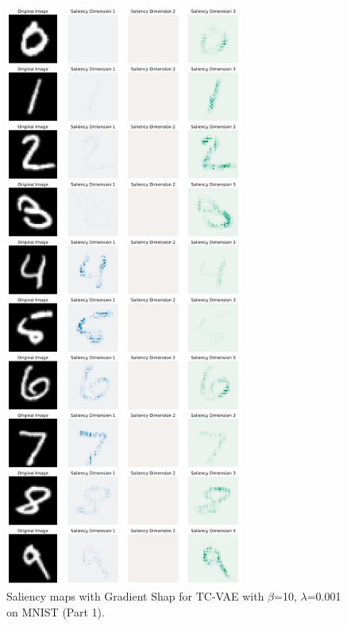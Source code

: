 \begin{figure}[h]
\centering
    \includegraphics[width=0.7\textwidth]{images/vae/tc_vae_10_sms_mnist_lambda_0_001_1.PNG}
\caption{Saliency maps with Gradient Shap for TC-VAE with  $\beta$=10, $\lambda$=0.001 on MNIST (Part 1).}\label{fig:tcvae10smsmnistlambda00011}
\end{figure}


